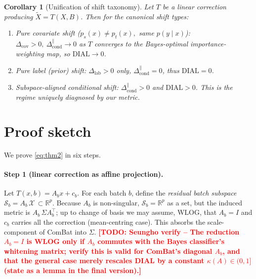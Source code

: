\documentclass[11pt,a4paper]{article}
\newtheorem{corollary}{Corollary}
\newcommand{\R}{\mathbb{R}}
\newcommand{\TODO}[1]{\textbf{\textcolor{red}{[TODO: Seungho verify -- #1]}}}
\begin{document}
\begin{corollary}[Unification of shift taxonomy]
\label{cor:unify}
Let $T$ be a linear correction producing $\tilde X=T(X,B)$. Then for
the canonical shift types:
\begin{enumerate}
\item[\textup{(a)}] \emph{Pure covariate shift}
  ($p_s(x)\ne p_t(x),$ same $p(y\mid x)$):
  $\Delta_{\text{cov}}>0,\ \Delta_{\text{cond}}^{\parallel}\to 0$
  as $T$ converges to the Bayes-optimal importance-weighting map, so
  $\mathrm{DIAL}\to 0$.
\item[\textup{(b)}] \emph{Pure label (prior) shift}: $\Delta_{\text{lab}}>0$
  only, $\Delta_{\text{cond}}^{\parallel}=0$, thus
  $\mathrm{DIAL}=0$.
\item[\textup{(c)}] \emph{Subspace-aligned conditional shift}:
  $\Delta_{\text{cond}}^{\parallel}>0$ and
  $\mathrm{DIAL}>0$. This is the regime uniquely diagnosed by our
  metric.
\end{enumerate}
\end{corollary}

\section{Proof sketch}

We prove \eqref{eq:thm2} in six steps.

\paragraph{Step 1 (linear correction as affine projection).}
Let $T(x,b)=A_b x + c_b$. For each batch $b$, define the \emph{residual
batch subspace}
$\mathcal{S}_b = A_b\,\mathcal{X}\,\subset\R^{p}$.
Because $A_b$ is non-singular, $\mathcal{S}_b=\R^{p}$ as a set, but the
induced metric is $A_b\,\Sigma A_b^{\top}$; up to change of basis we
may assume, WLOG, that $A_b=I$ and $c_b$ carries all the correction
(mean-centring case). This absorbs the scale-component of ComBat into
$\Sigma$. \TODO{The reduction $A_b\!=\!I$ is WLOG only if $A_b$ commutes
with the Bayes classifier's whitening matrix; verify this is valid for
ComBat's diagonal $A_b$, and that the general case merely rescales
DIAL by a constant $\kappa(A)\in(0,1]$ (state as a lemma in the final
version).}

\end{document}
